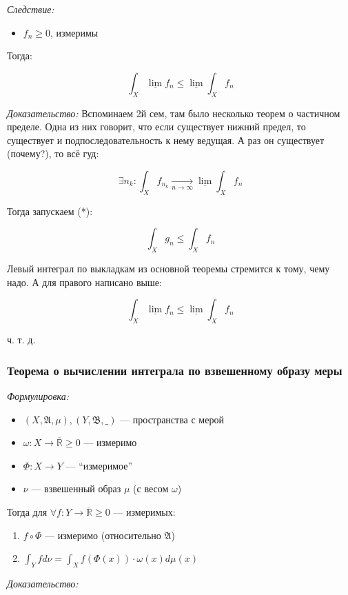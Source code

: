 \documentclass{article}
\def\rinf{\overline{\mathbb{R}}}
\def\goesto#1{\underset{#1}{\longrightarrow}}
\def\toinf#1{\goesto{#1 \rightarrow \infty}}
\def\ntoinf{\toinf{n}}
\begin{document}
\textit{Следствие: }

\begin{itemize}
    \item $f_n \ge 0$, измеримы
\end{itemize}

Тогда:

\[\int_{X} \underline{\lim}f_n \le \underline{\lim}\int_{X} f_n\]

\textit{Доказательство: }
Вспоминаем 2й сем, там было несколько теорем о частичном пределе. Одна из них говорит, что если существует нижний предел, то существует и подпоследовательность к нему ведущая. А раз он существует (почему?), то всё гуд:

\[\exists n_k: \int_{X} f_{n_k} \ntoinf \underline{\lim} \int_{X} f_n\]

Тогда запускаем (*):

\[\int_{X} g_n \le \int_{X} f_n\]

Левый интеграл по выкладкам из основной теоремы стремится к тому, чему надо. А для правого написано выше:

\[\int_{X} \underline{\lim}f_n \le \underline{\lim}\int_{X} f_n\]

ч. т. д. 

\subsubsection{Теорема о вычислении интеграла по взвешенному образу меры}
\textit{Формулировка:}

\begin{itemize}
    \item $(X, \mathfrak{A}, \mu), (Y, \mathfrak{B}, \_)$ --- пространства с мерой
    \item $\omega: X \rightarrow \rinf \ge 0$ --- измеримо
    \item $\Phi: X \rightarrow Y$ --- ``измеримое''
    \item $\nu$ --- взвешенный образ $\mu$ (с весом $\omega$)
\end{itemize}

Тогда для $\forall f: Y \rightarrow \rinf \ge 0$ --- измеримых:
\begin{enumerate}
    \item $f \circ \Phi$ --- измеримо (относительно $\mathfrak{A}$)
    \item $\int_{Y} f d\nu = \int_{X} f(\Phi(x))\cdot\omega(x) d\mu(x)$
\end{enumerate}
\textit{Доказательство:}
\end{document}
